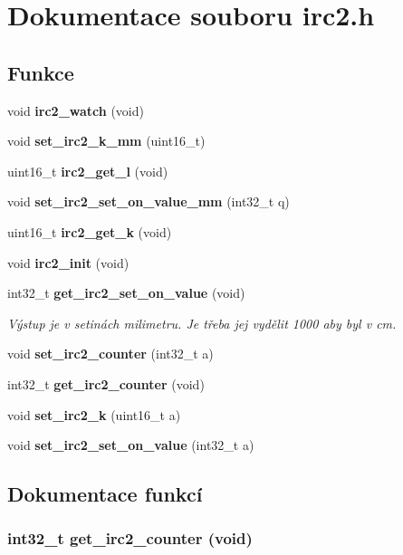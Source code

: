 \section{Dokumentace souboru irc2.h}
\label{irc2_8h}
\subsection*{Funkce}
\begin{DoxyCompactItemize}
\item 
void {\bf irc2\_\-watch} (void)
\item 
void {\bf set\_\-irc2\_\-k\_\-mm} (uint16\_\-t)
\item 
uint16\_\-t {\bf irc2\_\-get\_\-l} (void)
\item 
void {\bf set\_\-irc2\_\-set\_\-on\_\-value\_\-mm} (int32\_\-t q)
\item 
uint16\_\-t {\bf irc2\_\-get\_\-k} (void)
\item 
void {\bf irc2\_\-init} (void)
\item 
int32\_\-t {\bf get\_\-irc2\_\-set\_\-on\_\-value} (void)
\begin{DoxyCompactList}\small\item\em Výstup je v setinách milimetru. Je třeba jej vydělit 1000 aby byl v cm. \item\end{DoxyCompactList}\item 
void {\bf set\_\-irc2\_\-counter} (int32\_\-t a)
\item 
int32\_\-t {\bf get\_\-irc2\_\-counter} (void)
\item 
void {\bf set\_\-irc2\_\-k} (uint16\_\-t a)
\item 
void {\bf set\_\-irc2\_\-set\_\-on\_\-value} (int32\_\-t a)
\end{DoxyCompactItemize}


\subsection{Dokumentace funkcí}
\subsubsection[{get\_\-irc2\_\-counter}]{\setlength{\rightskip}{0pt plus 5cm}int32\_\-t get\_\-irc2\_\-counter (void)}\label{irc2_8h_a12bd5631a35458163e675a4738df8ac7}
